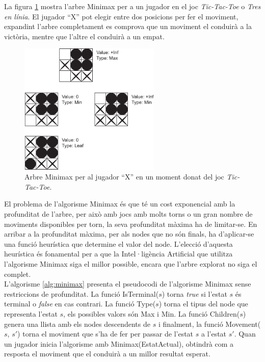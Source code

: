 \documentclass[12pt,a4paper]{article}
\begin{document}
La figura \ref{fig:minimax_tic_tac_toe} mostra l'arbre Minimax per a un jugador en el joc \emph{Tic-Tac-Toe} o \emph{Tres en línia}. El jugador ``X'' pot elegir entre dos posicions per fer el moviment, expandint l'arbre completament es comprova que un moviment el conduirà a la victòria, mentre que l'altre el conduirà a un empat.\\

\begin{figure}[h]
\centering
\includegraphics[width=0.6\textwidth]{minimax_tic_tac_toe.pdf}
\caption{Arbre Minimax per al jugador ``X'' en un moment donat del joc \emph{Tic-Tac-Toe}.}
\label{fig:minimax_tic_tac_toe}
\end{figure}

El problema de l'algorisme Minimax és que té un cost exponencial amb la profunditat de l'arbre, per això amb jocs amb molts torns o un gran nombre de moviments disponibles per torn, la seva profunditat màxima ha de limitar-se. En arribar a la profunditat màxima, per als nodes que no són finals, ha d'aplicar-se una funció heurística que determine el valor del node. L'elecció d'aquesta heurística és fonamental per a que la Intel·ligència Artificial que utilitza l'algorisme Minimax siga el millor possible, encara que l'arbre explorat no siga el complet.\\

L'algorisme \ref{alg:minimax} presenta el pseudocodi de l'algorisme Minimax sense restriccions de profunditat. La funció IsTerminal($s$) torna \emph{true} si l'estat $s$ és terminal o \emph{false} en cas contrari. La funció Type($s$) torna el tipus del node que representa l'estat $s$, els possibles valors són Max i Min. La funció Children($s$) genera una llista amb els nodes descendents de $s$ i finalment, la funció Movement($s$, $s'$) torna el moviment que s'ha de fer per passar de l'estat $s$ a l'estat $s'$. Quan un jugador inicia l'algorisme amb Minimax(EstatActual), obtindrà com a resposta el moviment que el conduirà a un millor resultat esperat.
\end{document}
